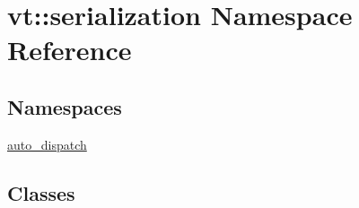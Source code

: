 \hypertarget{namespacevt_1_1serialization}{}\section{vt\+:\+:serialization Namespace Reference}
\label{namespacevt_1_1serialization}
\subsection*{Namespaces}
\begin{DoxyCompactItemize}
\item 
 \hyperlink{namespacevt_1_1serialization_1_1auto__dispatch}{auto\+\_\+dispatch}
\end{DoxyCompactItemize}
\subsection*{Classes}
